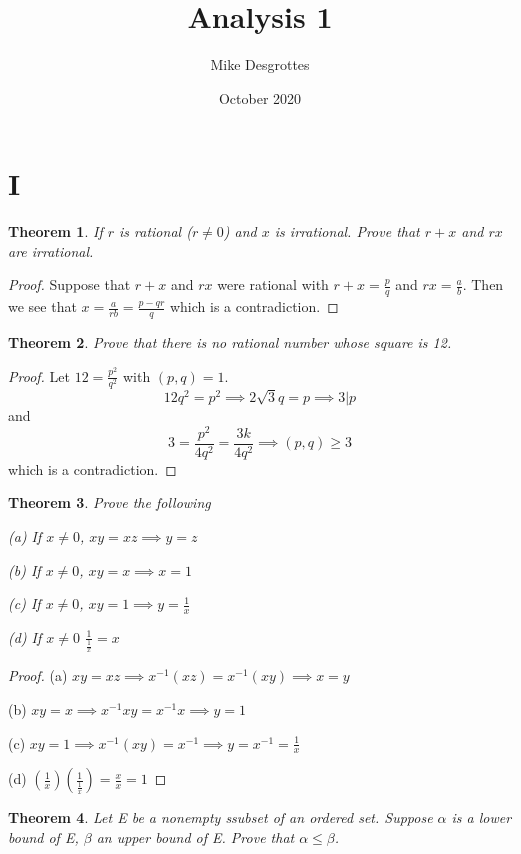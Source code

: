 \documentclass{article}
\title{Analysis 1}
\author{Mike Desgrottes}
\date{October 2020}
\theoremstyle{plain}
\newtheorem{theorem}{Theorem}
\theoremstyle{definition}
\begin{document}
\maketitle

\section{I}

\begin{theorem}
	If $r$ is rational ($r \not = 0$) and $x$ is irrational. Prove that $r + x$ and $rx$ are irrational.
\end{theorem}

\begin{proof}
	Suppose that $r + x$ and $rx$ were rational with $r + x = \frac{p}{q}$ and $rx = \frac{a}{b}$. Then we see that $x = \frac{a}{rb} = \frac{p - qr}{q}$ which is a contradiction.
\end{proof}

\begin{theorem}
	Prove that there is no rational number whose square is 12.
\end{theorem}
\begin{proof}
	Let $12 = \frac{p^{2}}{q^{2}}$ with $(p,q) = 1$. $$12q^{2} = p^{2} \implies 2\sqrt{3}q = p \implies 3 | p $$ and $$3 = \frac{p^{2}}{4q^{2}} = \frac{3k}{4q^{2}} \implies (p,q) \geq  3 $$ which is a contradiction.
\end{proof}

\begin{theorem}
	Prove the following

	(a) If $x \not = 0$, $xy = xz \implies y = z$

	(b) If $x \not = 0$, $xy = x \implies x = 1$

	(c) If $x \not = 0$, $xy = 1 \implies y = \frac{1}{x}$

	(d) If $x \not = 0$ $\frac{1}{\frac{1}{x}} = x$
\end{theorem}

\begin{proof}
	(a) $xy = xz \implies x^{-1}(xz) = x^{-1}(xy) \implies x = y$

	(b) $xy = x \implies x^{-1}xy = x^{-1}x \implies y = 1$

	(c) $xy = 1 \implies x^{-1}(xy) = x^{-1} \implies y = x^{-1} = \frac{1}{x}$

	(d) $(\frac{1}{x})(\frac{1}{\frac{1}{x}}) = \frac{x}{x} = 1$
\end{proof}

\begin{theorem}
	Let E be a nonempty ssubset of an ordered set. Suppose $\alpha$ is a lower bound of E, $\beta$ an upper bound of E. Prove that $\alpha \leq \beta$.
\end{theorem}
\end{document}
